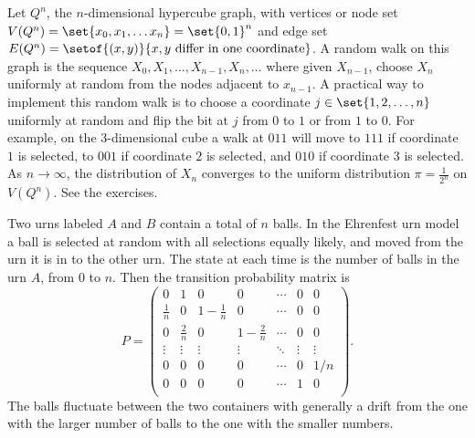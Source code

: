 \documentclass[12pt]{article}
\begin{document}
\begin{example}
    Let \( Q^n \), the \( n \)-dimensional hypercube graph, with
    vertices or node set \( V(Q^n) = \set{x_0, x_1, \dots x_n} = \set{0,1}^n
    \) and edge set \( E(Q^n) = \setof{(x,y)}{x, y \text{ differ in one
    coordinate}} \).%
    A random walk on this graph is the sequence \( X_0, X_1, \dots, X_{n-1},
    X_n, \dots \) where given \( X_{n-1} \), choose \( X_n \) uniformly
    at random from the nodes adjacent to \( x_{n-1} \).%
    A practical way to implement this random walk is to choose a
    coordinate \( j \in \set{1,2, \dots, n} \) uniformly at random and
    flip the bit at \( j \) from \( 0 \) to \( 1 \) or from \( 1 \) to \(
    0 \).  For example, on the \( 3 \)-dimensional cube a walk at \( 011
    \) will move to \( 111 \) if coordinate \( 1 \) is selected, to \( 001
    \) if coordinate \( 2 \) is selected, and \( 010 \) if coordinate \( 3 \)
    is selected.  As \( n \to \infty \), the distribution of \( X_n \)
    converges to the uniform distribution \( \pi = \frac{1}{2^n} \) on \(
    V(Q^n) \).  See the exercises.

    Two urns labeled \( A \) and \( B \) contain a total of \( n \)
    balls.  In the Ehrenfest urn model a%
    ball is selected at random with all selections equally likely, and
    moved from the urn it is in to the other urn.  The state at each
    time is the number of balls in the urn \( A \), from \( 0 \) to \( n
    \).  Then the transition probability matrix is
    \[
        P =
        \begin{pmatrix}
            0 & 1 & 0 & 0 & \cdots & 0 & 0 \\
            \frac{1}{n} & 0 & 1-\frac{1}{n} & 0 & \cdots & 0 & 0 \\
            0 & \frac{2}{n} & 0 & 1-\frac{2}{n} & \cdots & 0 & 0 \\
            \vdots & \vdots & \vdots & \vdots & \ddots& \vdots & \vdots
            \\
            0 & 0 & 0 & 0 & \cdots & 0 & 1/n \\
            0 & 0 & 0 & 0 & \cdots & 1 & 0 \\
        \end{pmatrix}
        .
    \] The balls fluctuate between the two containers with generally a drift from
    the one with the larger number of balls to the one with the smaller
    numbers.


\end{example}
\end{document}
